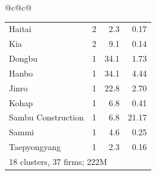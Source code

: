 \begin{table}
\begin{tabular}{@{}c@{\hspace{2.5em}}c@{}}
\begin{minipage}[t]{0.44\textheight}
{\begin{tabular}{lrrr}
Haitai & 2 & 2.3 & 0.17 \\
Kia & 2 & 9.1 & 0.14 \\
Dongbu & 1 & 34.1 & 1.73 \\
Hanbo & 1 & 34.1 & 4.44 \\
Jinro & 1 & 22.8 & 2.70 \\
Kohap & 1 & 6.8 & 0.41 \\
Sambu Construction & 1 & 6.8 & 21.17 \\
Sammi & 1 & 4.6 & 0.25 \\
Taepyongyang & 1 & 2.3 & 0.16 \\
\midrule
\multicolumn{4}{l}{18 clusters, 37 firms; \textdollar222M} \\
\bottomrule
\end{tabular}}
\end{minipage} 
\end{tabular}
\end{table}
